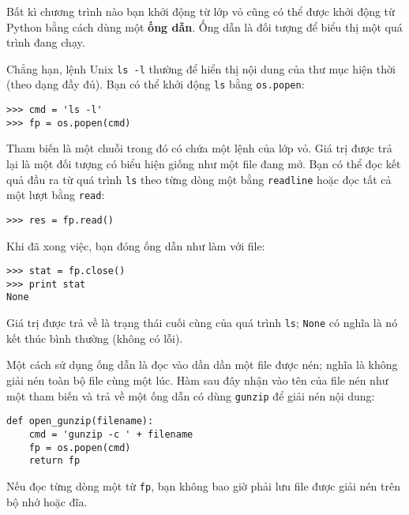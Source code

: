 \documentclass[11pt]{book}
\begin{document}

Bất kì chương trình nào bạn khởi động từ lớp vỏ cũng có thể được
khởi động từ Python bằng cách dùng một {\bf ống dẫn}. Ống dẫn là
đối tượng để biểu thị một quá trình đang chạy.

Chẳng hạn, lệnh Unix {\tt ls -l} thường để hiển thị 
nội dung của thư mục hiện thời (theo dạng đầy đủ). Bạn có thể
khởi động {\tt ls} bằng {\tt os.popen}:


\beforeverb
\begin{verbatim}
>>> cmd = 'ls -l'
>>> fp = os.popen(cmd)
\end{verbatim}
\afterverb
%
Tham biến là một chuỗi trong đó có chứa một lệnh của lớp vỏ.
Giá trị được trả lại là một đối tượng có biểu hiện giống như
một file đang mở. Bạn có thể đọc kết quả đầu ra từ quá trình {\tt ls}
theo từng dòng một bằng {\tt readline} hoặc đọc tất cả một lượt
bằng {\tt read}:


\beforeverb
\begin{verbatim}
>>> res = fp.read()
\end{verbatim}
\afterverb
%
Khi đã xong việc, bạn đóng ống dẫn như làm với file:


\beforeverb
\begin{verbatim}
>>> stat = fp.close()
>>> print stat
None
\end{verbatim}
\afterverb
%
Giá trị được trả về là trạng thái cuối cùng của quá trình {\tt ls};
{\tt None} có nghĩa là nó kết thúc bình thường (không có lỗi).


Một cách sử dụng ống dẫn là đọc vào dần dần một file được nén;
nghĩa là không giải nén toàn bộ file cùng một lúc. Hàm sau đây 
nhận vào tên của file nén như một tham biến và trả về một 
ống dẫn có dùng {\tt gunzip} để giải nén nội dung:

\beforeverb
\begin{verbatim}
def open_gunzip(filename):
    cmd = 'gunzip -c ' + filename
    fp = os.popen(cmd)
    return fp
\end{verbatim}
\afterverb
%
Nếu đọc từng dòng một từ {\tt fp}, bạn không bao giờ phải lưu 
file được giải nén trên bộ nhớ hoặc đĩa.
\end{document}
